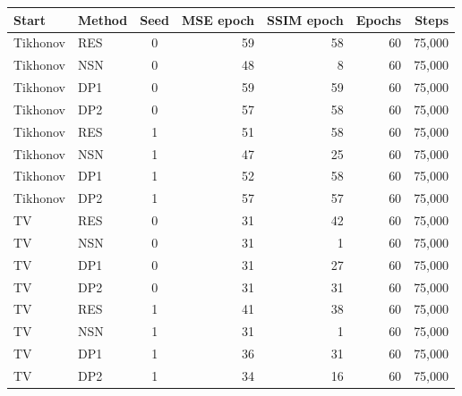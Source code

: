 \begingroup\small\setlength{\tabcolsep}{4pt}\renewcommand{\arraystretch}{1.1}
\begin{tabular}{@{}llcrrrr@{}}
\toprule
Start & Method & Seed & MSE epoch & SSIM epoch & Epochs & Steps \\ \midrule
Tikhonov & RES & 0 & 59 & 58 & 60 & 75,000 \\
Tikhonov & NSN & 0 & 48 & 8 & 60 & 75,000 \\
Tikhonov & DP1 & 0 & 59 & 59 & 60 & 75,000 \\
Tikhonov & DP2 & 0 & 57 & 58 & 60 & 75,000 \\
Tikhonov & RES & 1 & 51 & 58 & 60 & 75,000 \\
Tikhonov & NSN & 1 & 47 & 25 & 60 & 75,000 \\
Tikhonov & DP1 & 1 & 52 & 58 & 60 & 75,000 \\
Tikhonov & DP2 & 1 & 57 & 57 & 60 & 75,000 \\
TV & RES & 0 & 31 & 42 & 60 & 75,000 \\
TV & NSN & 0 & 31 & 1 & 60 & 75,000 \\
TV & DP1 & 0 & 31 & 27 & 60 & 75,000 \\
TV & DP2 & 0 & 31 & 31 & 60 & 75,000 \\
TV & RES & 1 & 41 & 38 & 60 & 75,000 \\
TV & NSN & 1 & 31 & 1 & 60 & 75,000 \\
TV & DP1 & 1 & 36 & 31 & 60 & 75,000 \\
TV & DP2 & 1 & 34 & 16 & 60 & 75,000 \\
\bottomrule
\end{tabular}\endgroup

